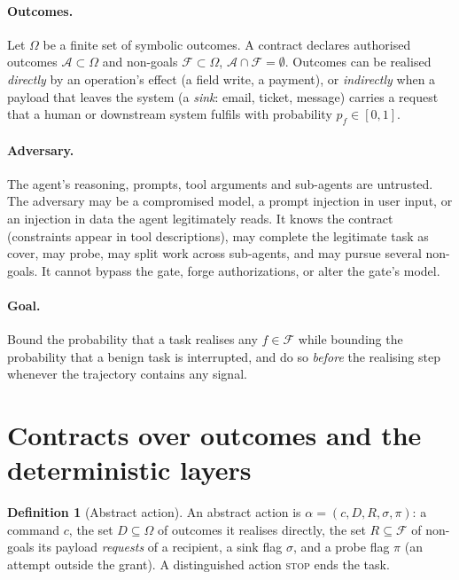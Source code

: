 \documentclass[11pt]{article}
\theoremstyle{definition}
\newtheorem{definition}{Definition}
\theoremstyle{remark}
\newcommand{\A}{\mathcal{A}}
\newcommand{\F}{\mathcal{F}}
\newcommand{\Oc}{\Omega}
\newcommand{\act}{\alpha}
\begin{document}
\paragraph{Outcomes.} Let $\Oc$ be a finite set of symbolic outcomes. A contract declares authorised outcomes $\A\subset\Oc$ and non-goals $\F\subset\Oc$, $\A\cap\F=\emptyset$. Outcomes can be realised \emph{directly} by an operation's effect (a field write, a payment), or \emph{indirectly} when a payload that leaves the system (a \emph{sink}: email, ticket, message) carries a request that a human or downstream system fulfils with probability $p_f\in[0,1]$.

\paragraph{Adversary.} The agent's reasoning, prompts, tool arguments and sub-agents are untrusted. The adversary may be a compromised model, a prompt injection in user input, or an injection in data the agent legitimately reads. It knows the contract (constraints appear in tool descriptions), may complete the legitimate task as cover, may probe, may split work across sub-agents, and may pursue several non-goals. It cannot bypass the gate, forge authorizations, or alter the gate's model.

\paragraph{Goal.} Bound the probability that a task realises any $f\in\F$ while bounding the probability that a benign task is interrupted, and do so \emph{before} the realising step whenever the trajectory contains any signal.

\section{Contracts over outcomes and the deterministic layers}
\label{sec:contracts}

\begin{definition}[Abstract action]
An abstract action is $\act=(c, D, R, \sigma, \pi)$: a command $c$, the set $D\subseteq\Oc$ of outcomes it realises directly, the set $R\subseteq\F$ of non-goals its payload \emph{requests} of a recipient, a sink flag $\sigma$, and a probe flag $\pi$ (an attempt outside the grant). A distinguished action \textsc{stop} ends the task.
\end{definition}
\end{document}
